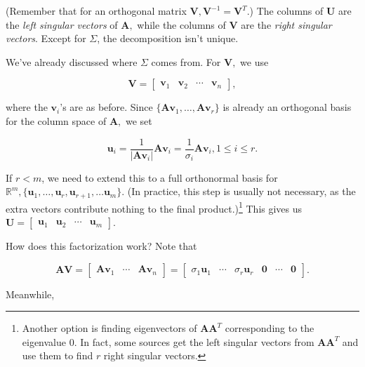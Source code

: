 \documentclass[
]{book}
\theoremstyle{definition}
\theoremstyle{definition}
\theoremstyle{definition}
\theoremstyle{definition}
\theoremstyle{remark}
\begin{document}
(Remember that for an orthogonal matrix \(\mathbf{V}, \mathbf{V}^{-1}=\mathbf{V}^T\).) The columns of \(\mathbf{U}\) are the \emph{left singular vectors} of \(\mathbf{A},\) while the columns of \(\mathbf{V}\) are the \emph{right singular vectors}. Except for \(\Sigma\), the decomposition isn't unique.

We've already discussed where \(\Sigma\) comes from. For \(\mathbf{V},\) we use

\[\mathbf{V}=\begin{bmatrix} \mathbf{v}_1 & \mathbf{v}_2 & \cdots & \mathbf{v}_n\end{bmatrix},\]

where the \(\mathbf{v}_i\)'s are as before. Since \(\{\mathbf{A}\mathbf{v}_1,\dots,\mathbf{A}\mathbf{v}_r\}\) is already an orthogonal basis for the column space of \(\mathbf{A},\) we set

\[\mathbf{u}_i=\frac{1}{|\mathbf{A}\mathbf{v}_i|}\mathbf{A}\mathbf{v}_i=\frac{1}{\sigma_i}\mathbf{A}\mathbf{v}_i, 1\leq i\leq r.\]

If \(r<m\), we need to extend this to a full orthonormal basis for \(\mathbb{R}^m,\{\mathbf{u}_1,\dots,\mathbf{u}_r,\mathbf{u}_{r+1},\dots \mathbf{u}_m\}\). (In practice, this step is usually not necessary, as the extra vectors contribute nothing to the final product.)\footnote{Another option is finding eigenvectors of \(\mathbf{A}\mathbf{A}^T\) corresponding to the eigenvalue 0. In fact, some sources \autocite{Strang} get the left singular vectors from \(\mathbf{A}\mathbf{A}^T\) and use them to find \(r\) right singular vectors.} This gives us \(\mathbf{U}=\begin{bmatrix}\mathbf{u}_1 & \mathbf{u}_2 & \cdots & \mathbf{u}_m\end{bmatrix}\).

How does this factorization work? Note that

\[\mathbf{A}\mathbf{V}=\begin{bmatrix}\mathbf{A}\mathbf{v}_1 & \cdots & \mathbf{A}\mathbf{v}_n\end{bmatrix}=\begin{bmatrix}\sigma_1\mathbf{u}_1 & \cdots & \sigma_r \mathbf{u}_r & \mathbf{0} & \cdots &\mathbf{0}\end{bmatrix}.\]

Meanwhile,
\end{document}
